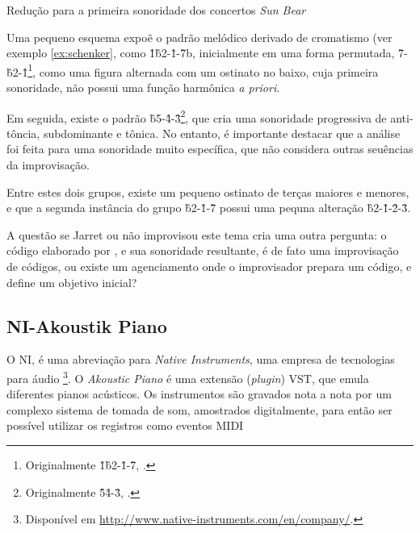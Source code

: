 \begin{example}{Redução para a primeira sonoridade dos concertos \emph{Sun Bear}}\label{ex:schenker}

Uma pequeno esquema expoẽ o padrão melódico derivado de cromatismo (ver exemplo \ref{ex:schenker}, como \^1\^b2-\^1-\^7b, inicialmente em uma forma permutada, \^7-\^{b2}-\^1\footnote{Originalmente \^1\^b2-\^1-\^7, .}, como uma figura alternada com um ostinato no baixo, cuja primeira sonoridade, não possui uma função harmônica \emph{a priori}.

Em seguida, existe o padrão \^{b5}-\^4-\^3\footnote{Originalmente \^5\^4-\^3, .}, que cria uma sonoridade progressiva de anti-tôncia, subdominante e tônica. No entanto, é importante destacar que a análise foi feita para uma sonoridade muito específica, que não considera outras seuências da improvisação.  

Entre estes dois grupos, existe um pequeno ostinato de terças maiores e menores, e que a segunda instância do grupo  \^{b2}-\^1-\^7 possui uma pequna alteração \^{b2}-\^1-\^2-\^3.

\centering{}
\end{example}

A questão se Jarret ou não improvisou este tema cria uma outra pergunta: o código elaborado por , e sua sonoridade resultante, é de fato uma improvisação de códigos, ou existe um agenciamento onde o improvisador prepara um código, e define um objetivo inicial?

\subsection{NI-Akoustik Piano}\label{sec:NI}

O NI, é uma abreviação para \emph{Native Instruments}, uma empresa de tecnologias para áudio \footnote{Disponível em \url{http://www.native-instruments.com/en/company/}.}. O \emph{Akoustic Piano} é uma extensão (\emph{plugin}) VST, que emula diferentes pianos acústicos. Os instrumentos são gravados nota a nota por um complexo sistema de tomada de som, amostrados digitalmente, para então ser possível utilizar os registros como eventos MIDI

